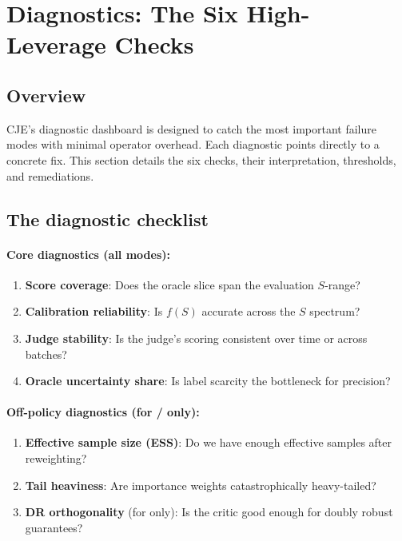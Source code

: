 \section{Diagnostics: The Six High-Leverage Checks}

\subsection{Overview}

CJE's diagnostic dashboard is designed to catch the most important failure modes with minimal operator overhead. Each diagnostic points directly to a concrete fix. This section details the six checks, their interpretation, thresholds, and remediations.

\subsection{The diagnostic checklist}

\paragraph{Core diagnostics (all modes):}
\begin{enumerate}
\item \textbf{Score coverage}: Does the oracle slice span the evaluation $S$-range?
\item \textbf{Calibration reliability}: Is $f(S)$ accurate across the $S$ spectrum?
\item \textbf{Judge stability}: Is the judge's scoring consistent over time or across batches?
\item \textbf{Oracle uncertainty share}: Is label scarcity the bottleneck for precision?
\end{enumerate}

\paragraph{Off-policy diagnostics (for \ips/\dr{} only):}
\begin{enumerate}[resume]
\item \textbf{Effective sample size (ESS)}: Do we have enough effective samples after reweighting?
\item \textbf{Tail heaviness}: Are importance weights catastrophically heavy-tailed?
\item \textbf{DR orthogonality} (for \dr{} only): Is the critic good enough for doubly robust guarantees?
\end{enumerate}

